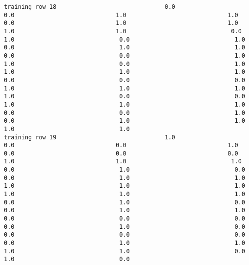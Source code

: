 \documentclass[11pt]{article}
\begin{document}
\begin{verbatim}
training row 18                               0.0                             0.0                             1.0                             1.0                             0.0                             1.0                             1.0                             1.0                             1.0                              0.0                              1.0                              0.0                              1.0                              0.0                              1.0                              1.0                              0.0                              0.0                              1.0                              1.0                              0.0                              1.0                              1.0                              1.0                              1.0                              0.0                              0.0                              0.0                              1.0                              1.0                              1.0                              1.0                              0.0                              0.0                              1.0                              1.0                              1.0                              0.0                              0.0                              1.0                              0.0                              1.0                              1.0                              1.0                              1.0
training row 19                               1.0                             0.0                             0.0                             1.0                             0.0                             0.0                             0.0                             1.0                             1.0                              1.0                              0.0                              1.0                              0.0                              0.0                              1.0                              1.0                              1.0                              1.0                              1.0                              1.0                              1.0                              1.0                              0.0                              1.0                              0.0                              0.0                              1.0                              1.0                              0.0                              0.0                              0.0                              0.0                              1.0                              0.0                              0.0                              0.0                              0.0                              0.0                              1.0                              1.0                              1.0                              1.0                              0.0                              1.0                              0.0

\end{verbatim}
\end{document}
